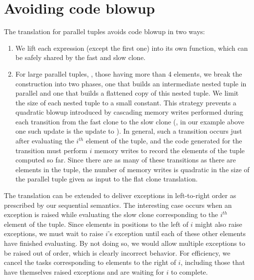 \documentclass[11pt]{article}
\begin{document}
\section{Avoiding code blowup}
\label{sec:avoiding-code-blowup}
The translation for parallel tuples avoids code blowup in two ways:
\begin{enumerate}
\item We lift each expression (except the first one) into its own function,
which can be safely shared by the fast and slow clone.
\item For large parallel tuples, \eg{}, those having more than 4 elements, we 
break the construction into two phases, one that builds an
intermediate nested tuple in parallel and one that builds a flattened
copy of this nested tuple. We limit the size of each nested tuple 
to a small constant. This strategy prevents a quadratic blowup introduced
by cascading memory writes performed during each transition 
from the fast clone to the slow clone (\eg{}, in our  example above
one such update is the update to ). In general, such a
transition occurs just after evaluating 
the $i^{th}$ element of the tuple, and the code generated for the transition
must perform $i$ memory writes to record the elements of the tuple computed so 
far. Since there are as many of these transitions as there are elements in the
tuple, the number of memory writes is quadratic in the size of the parallel 
tuple given as input to the flat clone translation.
\end{enumerate}

The translation can be extended to deliver exceptions in left-to-right order
as prescribed by our sequential semantics. The interesting case
occurs when an exception is raised while evaluating the slow clone 
corresponding to the $i^{th}$ element of the tuple. Since elements in
positions to the left of $i$ might also raise exceptions, we must wait
to raise $i$'s exception until each of these other elements have finished
evaluating. By not doing so, we would allow multiple exceptions to be
raised out of order, which is clearly incorrect behavior. For efficiency, 
we cancel the tasks corresponding to elements to the right of $i$, including
those that have themselves raised exceptions and are waiting for
$i$ to complete.
\end{document}
